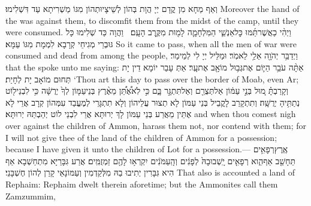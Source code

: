 {וְאַף מַחָא מִן קֳדָם יְיָ הֲוָת בְּהוֹן לְשֵׁיצָיוּתְהוֹן מִגּוֹ מַשְׁרִיתָא עַד דִּשְׁלִימוּ׃}
{Moreover the hand of the \lord\space was against them, to discomfit them from the midst of the camp, until they were consumed.}{}
{וַיְהִ֨י כַאֲשֶׁר\maqqaf תַּ֜מּוּ כׇּל\maqqaf אַנְשֵׁ֧י הַמִּלְחָמָ֛ה לָמ֖וּת מִקֶּ֥רֶב הָעָֽם׃ \setuma }
{וַהֲוָה כַּד שְׁלִימוּ כָּל גּוּבְרֵי מְגִיחֵי קְרָבָא לִמְמָת מִגּוֹ עַמָּא׃}
{So it came to pass, when all the men of war were consumed and dead from among the people,}{}
{וַיְדַבֵּ֥ר יְהֹוָ֖ה אֵלַ֥י לֵאמֹֽר׃}
{וּמַלֵּיל יְיָ לִי לְמֵימַר׃}
{that the \lord\space spoke unto me saying:}{}
{אַתָּ֨ה עֹבֵ֥ר הַיּ֛וֹם אֶת\maqqaf גְּב֥וּל מוֹאָ֖ב אֶת\maqqaf עָֽר׃}
{אַתְּ עָבַר יוֹמָא דֵין יָת תְּחוּם מוֹאָב יָת לְחָיַת׃}
{‘Thou art this day to pass over the border of Moab, even Ar;}{}
{וְקָרַבְתָּ֗ מ֚וּל בְּנֵ֣י עַמּ֔וֹן אַל\maqqaf תְּצֻרֵ֖ם וְאַל\maqqaf תִּתְגָּ֣ר בָּ֑ם כִּ֣י לֹֽא\maqqaf אֶ֠תֵּ֠ן מֵאֶ֨רֶץ בְּנֵי\maqqaf עַמּ֤וֹן לְךָ֙ יְרֻשָּׁ֔ה כִּ֥י לִבְנֵי\maqqaf ל֖וֹט נְתַתִּ֥יהָ יְרֻשָּֽׁה׃}
{וְתִתְקָרַב לָקֳבֵיל בְּנֵי עַמּוֹן לָא תְצוּר עֲלֵיהוֹן וְלָא תִתְגָּרֵי לְמֶעֱבַד עִמְּהוֹן קְרָב אֲרֵי לָא אֶתֵּין מֵאֲרַע בְּנֵי עַמּוֹן לָךְ יְרוּתָּא אֲרֵי לִבְנֵי לוֹט יְהַבְתַּהּ יְרוּתָּא׃}
{and when thou comest nigh over against the children of Ammon, harass them not, nor contend with them; for I will not give thee of the land of the children of Ammon for a possession; because I have given it unto the children of Lot for a possession.—}{}
{אֶֽרֶץ\maqqaf רְפָאִ֥ים תֵּחָשֵׁ֖ב אַף\maqqaf הִ֑וא רְפָאִ֤ים יָֽשְׁבוּ\maqqaf בָהּ֙ לְפָנִ֔ים וְהָֽעַמֹּנִ֔ים יִקְרְא֥וּ לָהֶ֖ם זַמְזֻמִּֽים׃}
{אֲרַע גִּבָּרַיָּא מִתְחַשְׁבָא אַף הִיא גִּבָּרִין יְתִיבוּ בַהּ מִלְּקַדְמִין וְעַמּוֹנָאֵי קָרַן לְהוֹן חֶשְׁבָּנֵי׃}
{That also is accounted a land of Rephaim: Rephaim dwelt therein aforetime; but the Ammonites call them Zamzummim,}{}
